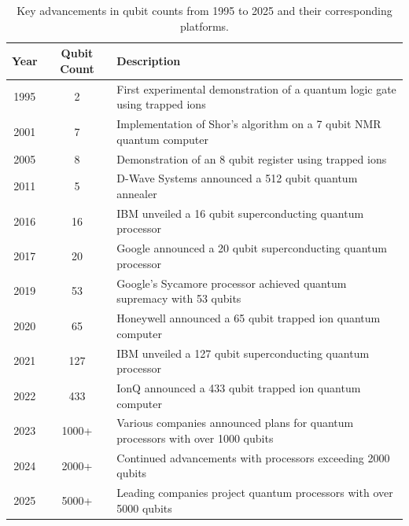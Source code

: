 \documentclass{elbioimp2}
\begin{document}
\begin{table}[t]
  \centering
  \begin{tabular}{|c|c|l|}
  \hline
  \textbf{Year} & \textbf{Qubit Count} & \textbf{Description} \\
  \hline
  1995 & 2 & First experimental demonstration of a quantum logic gate using trapped ions \\
  \hline
  2001 & 7 & Implementation of Shor's algorithm on a 7 qubit NMR quantum computer \\
  \hline
  2005 & 8 & Demonstration of an 8 qubit register using trapped ions \\
  \hline
  2011 & 5 & D-Wave Systems announced a 512 qubit quantum annealer \\
  \hline
  2016 & 16 & IBM unveiled a 16 qubit superconducting quantum processor \\
  \hline
  2017 & 20 & Google announced a 20 qubit superconducting quantum processor \\
  \hline
  2019 & 53 & Google's Sycamore processor achieved quantum supremacy with 53 qubits \\
  \hline
  2020 & 65 & Honeywell announced a 65 qubit trapped ion quantum computer \\
  \hline
  2021 & 127 & IBM unveiled a 127 qubit superconducting quantum processor \\
  \hline
  2022 & 433 & IonQ announced a 433 qubit trapped ion quantum computer \\
  \hline
  2023 & 1000+ & Various companies announced plans for quantum processors with over 1000 qubits \\
  \hline
  2024 & 2000+ & Continued advancements with processors exceeding 2000 qubits \\
  \hline
  2025 & 5000+ & Leading companies project quantum processors with over 5000 qubits \\
  \hline
  \end{tabular}
  \caption{Key advancements in qubit counts from 1995 to 2025 and their corresponding platforms.}\label{tab:qubit_counts}
\end{table}
\end{document}
